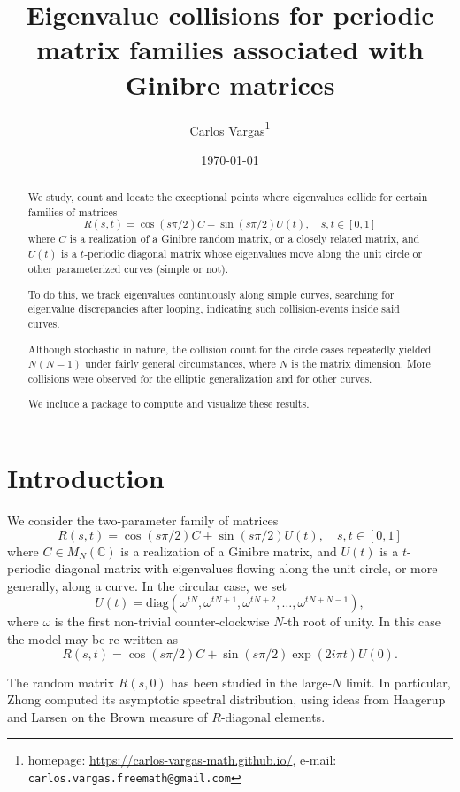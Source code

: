 \documentclass{article}
\title{Eigenvalue collisions for
periodic matrix families associated with Ginibre matrices}
\author{Carlos Vargas\thanks{homepage: \url{https://carlos-vargas-math.github.io/}, e-mail: \texttt{carlos.vargas.freemath@gmail.com}}}
\date{\today}
\begin{document}
	\maketitle	
	\begin{abstract}
		We study, count and locate the exceptional points where eigenvalues collide 
		for certain families of matrices 
		$$R(s,t) = \cos(s \pi / 2)C + \sin(s \pi / 2)U(t), \quad  s,t \in [0,1]$$ 
		where $C$ is a realization of a Ginibre random matrix, or a closely related matrix, 
		and $U(t)$ is a $t$-periodic diagonal matrix whose eigenvalues move along 
		the unit circle or other parameterized curves (simple or not).
	
		To do this, we track eigenvalues continuously 
		along simple curves, searching for eigenvalue discrepancies after looping, 
		indicating such collision-events inside said curves. 
		
		Although stochastic in nature, the collision count for the circle cases repeatedly
		yielded $N(N-1)$ under fairly general circumstances, where $N$ is the matrix dimension. 
		More collisions were observed for the elliptic generalization and for other curves.
	
		We include a package to compute and visualize these results.	
	\end{abstract} 

	\section{Introduction} \label{section:introduction}
	We consider the two-parameter family of matrices
	\[
	R(s,t) = \cos(s \pi / 2)C + \sin(s \pi / 2)U(t), \quad  s,t \in [0,1]
	\]
	where $C \in M_N(\mathbb{C})$ is a realization of a Ginibre matrix, 
	and $U(t)$ is a $t$-periodic diagonal matrix with eigenvalues 
	flowing along the unit circle, or more generally, along a curve. 
	In the circular case, we set
	\[
	U(t) = \mathrm{diag}\left(\omega^{tN}, \omega^{tN+1}, \omega^{tN+2}, \dots, \omega^{tN+N-1}\right),
	\]
	where $\omega$ is the first non-trivial counter-clockwise $N$-th root of unity. 
	In this case the model may be re-written as
	$$R(s,t) = \cos(s \pi / 2)C + \sin(s \pi / 2)\exp(2i \pi t)U(0).$$

	The random matrix $R(s,0)$ has been studied in the large-$N$ limit. 
	In particular, Zhong \cite{Zhong-2022} computed its asymptotic spectral distribution, using ideas from Haagerup and Larsen \cite{Haagerup-Larsen-2010} 
	on the Brown measure of $R$-diagonal elements. 
\end{document}
